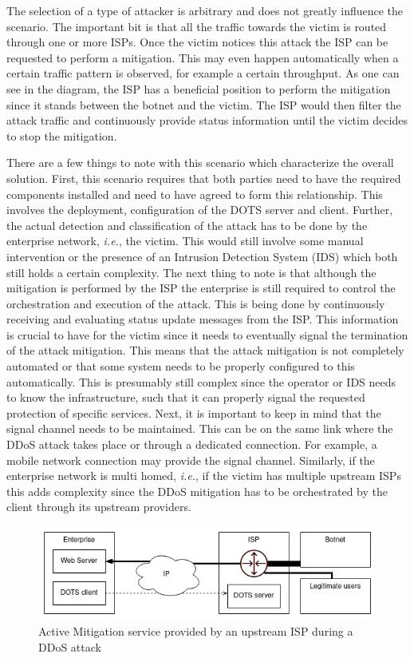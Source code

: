 The selection of a type of attacker is arbitrary and does not greatly influence the scenario. The important bit is that all the traffic towards the victim is routed through one or more ISPs. Once the victim notices this attack the ISP can be requested to perform a mitigation. This may even happen automatically when a certain traffic pattern is observed, for example a certain throughput. As one can see in the diagram, the ISP has a beneficial position to perform the mitigation since it stands between the botnet and the victim. The ISP would then filter the attack traffic and continuously provide status information until the victim decides to stop the mitigation. 

There are a few things to note with this scenario which characterize the overall solution. First, this scenario requires that both parties need to have the required components installed and need to have agreed to form this relationship. This involves the deployment, configuration of the DOTS server and client. Further, the actual detection and classification of the attack has to be done by the enterprise network, \emph{i.e.}, the victim. This would still involve some manual intervention or the presence of an Intrusion Detection System (IDS) which both still holds a certain complexity.
The next thing to note is that although the mitigation is performed by the ISP the enterprise is still required to control the orchestration and execution of the attack. This is being done by continuously receiving and evaluating status update messages from the ISP. This information is crucial to have for the victim since it needs to eventually signal the termination of the attack mitigation. This means that the attack mitigation is not completely automated or that some system needs to be properly configured to this automatically. This is presumably still complex since the operator or IDS needs to know the infrastructure, such that it can properly signal the requested protection of specific services. Next, it is important to keep in mind that the signal channel needs to be maintained. This can be on the same link where the DDoS attack takes place or through a dedicated connection. For example, a mobile network connection may provide the signal channel. Similarly, if the enterprise network is multi homed, \emph{i.e.}, if the victim has multiple upstream ISPs this adds complexity since the DDoS mitigation has to be orchestrated by the client through its upstream providers.

\begin{figure}
    \centering
    \includegraphics[width=16cm]{Seminar-Template/Talk7/images/ISP-DMS.png}
    \caption{Active Mitigation service provided by an upstream ISP during a DDoS attack}
    \label{fig:isp-mitigation}
\end{figure}{}

